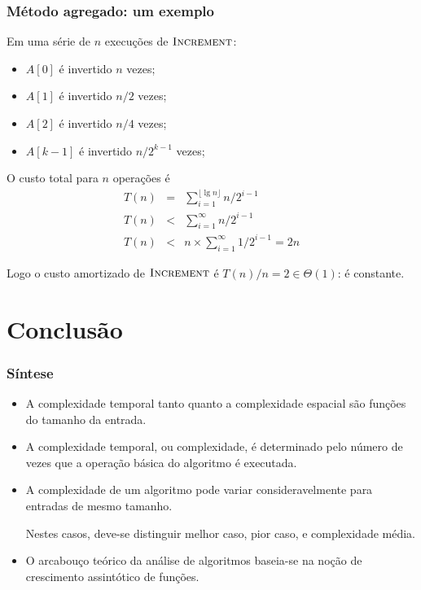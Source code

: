 \documentclass[handout]{beamer}
\begin{document}
\begin{frame}

\frametitle{Método agregado: um exemplo}

Em uma série de $n$ execuções de $\textnormal{\scshape Increment}$:
\begin{itemize}
\item $A[0]$ é invertido $n$ vezes;
\item $A[1]$ é invertido $n/2$ vezes;
\item $A[2]$ é invertido $n/4$ vezes;
\item $A[k-1]$ é invertido $n/2^{k-1}$ vezes;
\end{itemize}
O custo total para $n$ operações é 
\begin{eqnarray*}
T(n) & = & \sum_{i=1}^{\lfloor \lg n \rfloor} n/2^{i-1} \\
T(n) & < & \sum_{i=1}^{\infty} n/2^{i-1} \\
T(n) & < & n \times \sum_{i=1}^{\infty} 1/2^{i-1} = 2n
\end{eqnarray*}

Logo o custo amortizado de $\textnormal{\scshape Increment}$ é $T(n)/n = 2 \in \Theta(1)$: é \alert{constante}.

\end{frame}

\section{Conclusão}

\begin{frame}
\frametitle{Síntese}
\begin{itemize}
\item A complexidade temporal tanto quanto a complexidade espacial são
funções do tamanho da entrada.
\item A complexidade temporal, ou complexidade, é determinado pelo número
de vezes que a operação básica do algoritmo é executada.
\item A complexidade de um algoritmo pode variar consideravelmente para
entradas de mesmo tamanho. 

Nestes casos, deve-se distinguir melhor caso, pior caso, e complexidade média.
\item O arcabouço teórico da análise de algoritmos baseia-se na noção de
  crescimento assintótico de funções.
\end{itemize}
\end{frame}
\end{document}
